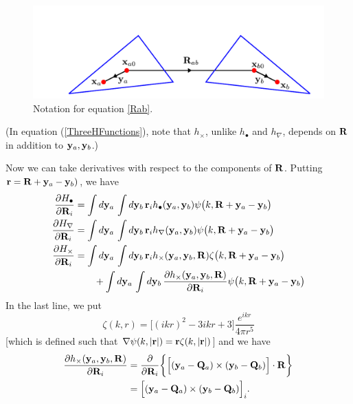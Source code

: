 \documentclass[letterpaper]{article}
\begin{document}
\begin{figure}
\begin{center}
\includegraphics{figures/PPIDerivatives.pdf}
\caption{Notation for equation \ref{Rab}.}
\label{RabFigure}
\end{center}
\end{figure}
(In equation (\ref{ThreeHFunctions}), note that $h_\times$, 
unlike $h_\bullet$ and $h_\nabla$, depends on $\mathbf{R}$ in 
addition to $\mathbf{y}_a, \mathbf{y}_b$.)

Now we can take derivatives with respect to the components 
of $\mathbf{R}$. Putting $\mathbf{r} = \mathbf{R} + \mathbf{y}_a - \mathbf{y}_b)$, we have
\begin{align*}
  \frac{\partial H_\bullet}{\partial \mathbf{R}_i}
&= \int d\mathbf{y}_a \, \int d\mathbf{y}_b \,
   \mathbf{r}_i 
   h_\bullet(\mathbf{y}_a, \mathbf{y}_b)
   \psi\big(k, \mathbf{R} + \mathbf{y}_a - \mathbf{y}_b \big) 
\\
  \frac{\partial H_\nabla}{\partial \mathbf{R}_i}
&= \int d\mathbf{y}_a \, \int d\mathbf{y}_b \,
   \mathbf{r}_i 
   h_\nabla(\mathbf{y}_a, \mathbf{y}_b)
   \psi\big(k, \mathbf{R} + \mathbf{y}_a - \mathbf{y}_b \big)
\\
  \frac{\partial H_\times}{\partial \mathbf{R}_i}
&= 
   \int d\mathbf{y}_a \, \int d\mathbf{y}_b \,
   \mathbf{r}_i
   h_\times(\mathbf{y}_a, \mathbf{y}_b, \mathbf{R})
   \zeta\big(k, \mathbf{R} + \mathbf{y}_a - \mathbf{y}_b \big)
\\
&\qquad + 
   \int d\mathbf{y}_a \, \int d\mathbf{y}_b \,
   \frac{\partial h_\times(\mathbf{y}_a, \mathbf{y}_b, \mathbf{R})}{\partial \mathbf{R}_i}
   \psi\big(k, \mathbf{R} + \mathbf{y}_a - \mathbf{y}_b \big)
\end{align*}
In the last line, we put
$$ \zeta(k, r) = \Big[ (ikr)^2 -3ikr + 3\Big]\frac{e^{ikr}}{4\pi r^5}$$
[which is defined such that $\nabla \psi(k,|\mathbf{r}|) = \mathbf{r} \zeta(k, |\mathbf{r}|)$]
and we have 
\begin{align*}
 \frac{\partial  h_\times(\mathbf{y}_a, \mathbf{y}_b, \mathbf{R})}{\partial \mathbf{R}_i}
&=\frac{\partial }{\partial \mathbf{R}_i} 
   \bigg\{ \Big[ (\mathbf{y}_a - \mathbf{Q}_a) \times (\mathbf{y}_b - \mathbf{Q}_b) \Big]
           \cdot \mathbf{R} 
   \bigg\}
\\
&= \Big[ (\mathbf{y}_a - \mathbf{Q}_a) \times (\mathbf{y}_b - \mathbf{Q}_b) \Big]_i.
\end{align*}
\end{document}
